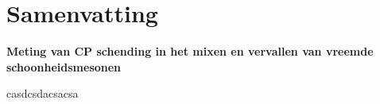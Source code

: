 \chapter*{Samenvatting}
\chaptermark{}

{\Large\bf
  Meting van CP schending in het mixen en vervallen van vreemde schoonheidsmesonen
}
\vspace*{0.05\textwidth}

\noindent
casdcsdacsacsa

